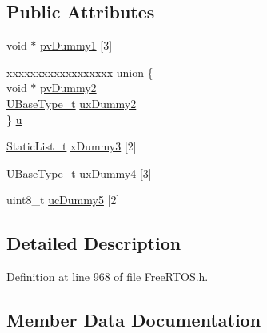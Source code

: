 \subsection*{Public Attributes}
\begin{DoxyCompactItemize}
\item 
void $\ast$ \hyperlink{structx_s_t_a_t_i_c___q_u_e_u_e_aacf22a66a8d723648995692ec77ee416}{pv\+Dummy1} \mbox{[}3\mbox{]}
\item 
\begin{tabbing}
xx\=xx\=xx\=xx\=xx\=xx\=xx\=xx\=xx\=\kill
union \{\\
\>void $\ast$ \hyperlink{structx_s_t_a_t_i_c___q_u_e_u_e_adb72a02b22a558f6fad381d65af5ac68}{pvDummy2}\\
\>\hyperlink{portmacro_8h_a646f89d4298e4f5afd522202b11cb2e6}{UBaseType\_t} \hyperlink{structx_s_t_a_t_i_c___q_u_e_u_e_ab4e6a2a0bb59ba54d05927e99afd553f}{uxDummy2}\\
\} \hyperlink{structx_s_t_a_t_i_c___q_u_e_u_e_a8a896145a0d9376a7e2713afdd782c41}{u}\\

\end{tabbing}\item 
\hyperlink{_free_r_t_o_s_8h_a9735ad9101a2bd25f83a62089a4acee6}{Static\+List\+\_\+t} \hyperlink{structx_s_t_a_t_i_c___q_u_e_u_e_add0de93e08b632124122850bcd543597}{x\+Dummy3} \mbox{[}2\mbox{]}
\item 
\hyperlink{portmacro_8h_a646f89d4298e4f5afd522202b11cb2e6}{U\+Base\+Type\+\_\+t} \hyperlink{structx_s_t_a_t_i_c___q_u_e_u_e_a502854697731754ce445f6503d14b127}{ux\+Dummy4} \mbox{[}3\mbox{]}
\item 
uint8\+\_\+t \hyperlink{structx_s_t_a_t_i_c___q_u_e_u_e_a541c5044376603540cc3c9cabcbdc5e6}{uc\+Dummy5} \mbox{[}2\mbox{]}
\end{DoxyCompactItemize}


\subsection{Detailed Description}


Definition at line 968 of file Free\+R\+T\+O\+S.\+h.



\subsection{Member Data Documentation}
